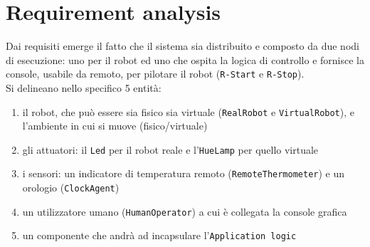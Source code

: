 \documentclass{../llncs}
\newcommand{\code}[1]{{\color{blue}\small{\texttt{#1}}}}
\newcommand{\labelsec}[1]{\label{sec:#1}}
\begin{document}
%

\section{Requirement analysis}
\labelsec{ReqAnalysis}
Dai requisiti emerge il fatto che il sistema sia distribuito e composto da due nodi di esecuzione: uno per il robot ed uno che ospita la logica di controllo e fornisce la console, usabile da remoto, per pilotare il robot (\code{R-Start} e \code{R-Stop}).\\

\noindent Si delineano nello specifico 5 entità:
\begin{enumerate}
\item il robot, che può essere sia fisico sia virtuale (\texttt{RealRobot} e \texttt{VirtualRobot}), e l'ambiente in cui si muove (fisico/virtuale)
\item gli attuatori: il \texttt{Led} per il robot reale e l'\texttt{HueLamp} per quello virtuale
\item i sensori: un indicatore di temperatura remoto (\texttt{RemoteThermometer}) e un orologio (\texttt{ClockAgent})
\item un utilizzatore umano (\texttt{HumanOperator}) a cui è collegata la console grafica
\item un componente che andrà ad incapsulare l'\texttt{Application logic}
\end{enumerate}
\end{document}

